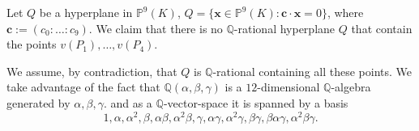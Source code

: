 \documentclass[a4paper,11pt]{amsart}%
\newcommand{\comment}[1]{}
\newcommand{\vSmall}{\vspace{3mm}\noindent}
\newcommand\Q{\mathbb{Q}}
\renewcommand\P{\mathbb{P}}
\theoremstyle{definition}
\begin{document}
\comment{
\begin{align*}
v(P_1)&=(0:0:0:0:0:0:0:1:0:0)\\
v(P_2)&=(0:0:0:0:4\alpha^2:-2s:4\alpha:s\alpha:-2\alpha^2:4)\\
v(P_3)&=(\gamma^2:\beta\gamma:-\alpha^2\gamma-\alpha\beta\gamma:\alpha\gamma:\beta^2:\alpha^2\beta-
\alpha-2\beta\\
&:\alpha\beta:s\alpha+\alpha^2+2\alpha\beta:-s-\alpha^2\beta:\alpha^2)\\
v(P_4)&=(\gamma^2:-\beta\gamma:\alpha^2\gamma+\alpha\beta\gamma:-\alpha\gamma:\beta^2:\alpha^2\beta-
\alpha-2\beta\\
&:\alpha\beta:s\alpha+\alpha^2+2\alpha\beta:-s-\alpha^2\beta:\alpha^2)
\end{align*}
where we know that
\begin{align*}
\gamma^2 &= -\frac{1}{2}-\beta\alpha^{-1} = -\frac{1}{2}-\frac{\beta\alpha^2}{s},\\
\beta^2 &= 1-2\beta(\alpha-\alpha^{-1}) = 1-2\beta\left(\alpha-\frac{\alpha^2}{s}\right).
\end{align*}
}

\vSmall
Let $Q$ be a hyperplane in $\P^9(K)$, $Q = \{\bm{x} \in \P^9(K) : \bm{c} \cdot \bm{x} = 0\}$, where $\bm{c}:=(c_0:\ldots:c_9)$. We claim that there is no $\Q$-rational hyperplane $Q$ that contain the points $v(P_1),\dots, v(P_4)$.

We assume, by contradiction, that $Q$ is $\Q$-rational containing all these points.
We take advantage of the fact that $\Q(\alpha,\beta,\gamma)$ is a $12$-dimensional
$\Q$-algebra generated by $\alpha,\beta,\gamma$.
and as a $\Q$-vector-space it is spanned by a basis
$$1,\alpha,\alpha^2, \beta,\alpha\beta,\alpha^2\beta,\gamma,\alpha\gamma,\alpha^2\gamma,\beta\gamma,\beta\alpha\gamma,\alpha^2\beta\gamma.$$
\end{document}
